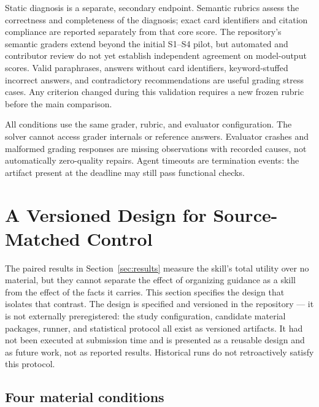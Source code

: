 \documentclass[11pt]{article}
\begin{document}
Static diagnosis is a separate, secondary endpoint.
Semantic rubrics assess the correctness and completeness of the diagnosis; exact card identifiers and citation compliance are reported separately from that core score.
The repository's semantic graders extend beyond the initial S1--S4 pilot, but automated and contributor review do not yet establish independent agreement on model-output scores.
Valid paraphrases, answers without card identifiers, keyword-stuffed incorrect answers, and contradictory recommendations are useful grading stress cases.
Any criterion changed during this validation requires a new frozen rubric before the main comparison.

All conditions use the same grader, rubric, and evaluator configuration.
The solver cannot access grader internals or reference answers.
Evaluator crashes and malformed grading responses are missing observations with recorded causes, not automatically zero-quality repairs.
Agent timeouts are termination events: the artifact present at the deadline may still pass functional checks.

\section{A Versioned Design for Source-Matched Control}
\label{sec:setup}

The paired results in Section~\ref{sec:results} measure the skill's total utility over no material, but they cannot separate the effect of organizing guidance as a skill from the effect of the facts it carries.
This section specifies the design that isolates that contrast.
The design is specified and versioned in the repository --- it is not externally preregistered: the study configuration, candidate material packages, runner, and statistical protocol all exist as versioned artifacts.
It had not been executed at submission time and is presented as a reusable design and as future work, not as reported results.
Historical runs do not retroactively satisfy this protocol.

\subsection{Four material conditions}
\label{sec:conditions}
\end{document}
